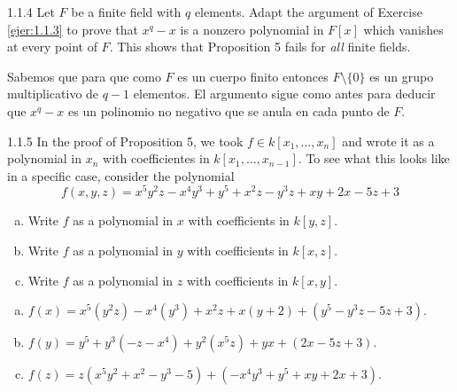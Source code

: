 \documentclass[twoside]{article}
\begin{document}
\newpage

\begin{ejercicio}{1.1.4}
Let $F$ be a finite field with $q$ elements.
Adapt the argument of Exercise \ref{ejer:1.1.3} to prove that $x^q-x$ is a nonzero polynomial in $F[x]$ which vanishes at every point of $F$.
This shows that Proposition 5 fails for \emph{all} finite fields.
\end{ejercicio}
\begin{solucion}
Sabemos que para que como $F$ es un cuerpo finito entonces $F\setminus\{0\}$ es un grupo multiplicativo de $q-1$ elementos.
El argumento sigue como antes para deducir que $x^q-x$ es un polinomio no negativo que se anula en cada punto de $F$.
\end{solucion}

\newpage

\begin{ejercicio}{1.1.5}
In the proof of Proposition 5, we took $f \in k[x_1,\dots,x_n]$ and wrote it as a polynomial in $x_n$ with coefficientes in $k[x_1,\dots,x_{n-1}]$.
To see what this looks like in a specific case, consider the polynomial
\[ f(x,y,z) = x^5y^2z-x^4y^3+y^5+x^2z-y^3z+xy+2x-5z+3 \]
\begin{enumerate}[a.]
\item Write $f$ as a polynomial in $x$ with coefficients in $k[y,z]$.
\item Write $f$ as a polynomial in $y$ with coefficients in $k[x,z]$.
\item Write $f$ as a polynomial in $z$ with coefficients in $k[x,y]$.
\end{enumerate}
\end{ejercicio}
\begin{solucion}
\begin{enumerate}[a.]
\item $f(x)=x^5(y^2z)-x^4(y^3)+x^2z+x(y+2)+(y^5-y^3z-5z+3)$.
\item $f(y)=y^5+y^3(-z-x^4)+y^2(x^5z)+yx+(2x-5z+3)$.
\item $f(z)=z(x^5y^2+x^2-y^3-5)+(-x^4y^3+y^5+xy+2x+3)$.
\end{enumerate}
\end{solucion}

\newpage
\end{document}
